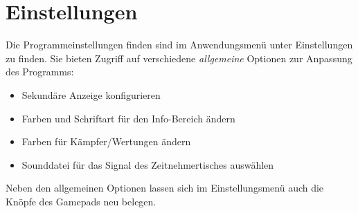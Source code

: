 ﻿\documentclass[11pt,numbers=noenddot]{scrreprt}
\begin{document}
\section{Einstellungen}
\label{bkm:Programmeinstellungen}
Die Programmeinstellungen finden sind im Anwendungsmenü unter Einstellungen zu finden. Sie bieten Zugriff auf verschiedene \textit{allgemeine} Optionen zur Anpassung des Programms:
\begin{itemize}
	\item Sekundäre Anzeige konfigurieren
	\item Farben und Schriftart für den Info-Bereich ändern
	\item Farben für Kämpfer/Wertungen ändern
	\item Sounddatei für das Signal des Zeitnehmertisches auswählen
\end{itemize}

Neben den allgemeinen Optionen lassen sich im Einstellungsmenü auch die Knöpfe des Gamepads neu belegen.
\end{document}

